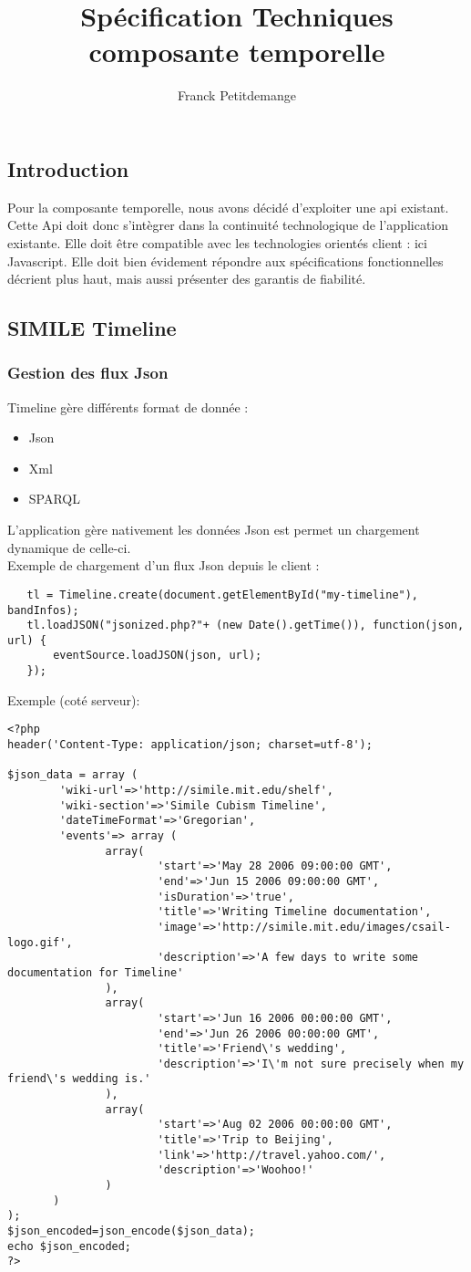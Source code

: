 \documentclass[10pt,a4paper]{article}
\author{Franck Petitdemange}
\title{Spécification Techniques composante temporelle}
\begin{document}
\subsection{Introduction}
Pour la composante temporelle, nous avons décidé d'exploiter une api existant. Cette Api doit donc s'intègrer dans la continuité technologique de l'application existante. Elle doit être compatible avec les technologies orientés client : ici Javascript. Elle doit bien évidement répondre aux spécifications fonctionnelles décrient plus haut, mais aussi présenter des garantis de fiabilité.

\subsection{SIMILE Timeline}
\subsubsection{Gestion des flux Json}
Timeline gère différents format de donnée : 
\begin{itemize}
\item Json
\item Xml
\item SPARQL
\end{itemize}
L'application gère nativement les données Json est permet un chargement dynamique de celle-ci.\\
Exemple de chargement d'un flux Json depuis le client :  
\begin{verbatim}
   tl = Timeline.create(document.getElementById("my-timeline"), bandInfos);
   tl.loadJSON("jsonized.php?"+ (new Date().getTime()), function(json, url) {
       eventSource.loadJSON(json, url);
   });
\end{verbatim}
Exemple (coté serveur):
\begin{verbatim}
<?php
header('Content-Type: application/json; charset=utf-8');

$json_data = array (
        'wiki-url'=>'http://simile.mit.edu/shelf',
        'wiki-section'=>'Simile Cubism Timeline',
        'dateTimeFormat'=>'Gregorian',
        'events'=> array (
               array(
                       'start'=>'May 28 2006 09:00:00 GMT',
                       'end'=>'Jun 15 2006 09:00:00 GMT',
                       'isDuration'=>'true',
                       'title'=>'Writing Timeline documentation',
                       'image'=>'http://simile.mit.edu/images/csail-logo.gif',
                       'description'=>'A few days to write some documentation for Timeline'
               ),
               array(
                       'start'=>'Jun 16 2006 00:00:00 GMT',
                       'end'=>'Jun 26 2006 00:00:00 GMT',
                       'title'=>'Friend\'s wedding',
                       'description'=>'I\'m not sure precisely when my friend\'s wedding is.'
               ),
               array(
                       'start'=>'Aug 02 2006 00:00:00 GMT',
                       'title'=>'Trip to Beijing',
                       'link'=>'http://travel.yahoo.com/',
                       'description'=>'Woohoo!'
               )
       )
);
$json_encoded=json_encode($json_data);
echo $json_encoded;
?>
\end{verbatim}
\end{document}
